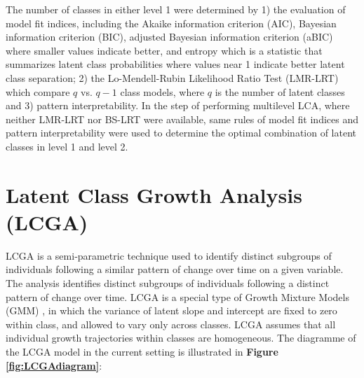 The number of classes in either level 1 were determined by 1) the evaluation of model fit indices, including the Akaike information criterion (AIC), Bayesian information criterion (BIC), adjusted Bayesian information criterion (aBIC) where smaller values indicate better, and entropy which is a statistic that summarizes latent class probabilities where values near 1 indicate better latent class separation; 2) the Lo-Mendell-Rubin Likelihood Ratio Test (LMR-LRT) \parencite{lo2001testing, nylund2007deciding} which compare $q$ vs. $q-1$ class models, where $q$ is the number of latent classes and 3) pattern interpretability. In the step of performing multilevel LCA, where neither LMR-LRT nor BS-LRT were available, same rules of model fit indices and pattern interpretability were used to determine the optimal combination of latent classes in level 1 and level 2. \vspace{-0.3cm}

\section{Latent Class Growth Analysis (LCGA)}\vspace{-0.3cm}



LCGA is a semi‐parametric technique used to identify distinct subgroups of individuals following a similar pattern of change over time on a given variable. The analysis identifies distinct subgroups of individuals following a distinct pattern of change over time.  LCGA is a special type of Growth Mixture Models (GMM) \parencite{jung2008introduction}, in which the variance of latent slope and intercept are fixed to zero within class, and allowed to vary only across classes. LCGA assumes that all individual growth trajectories within classes are homogeneous. The diagramme of the LCGA model in the current setting is illustrated in \textbf{Figure \ref{fig:LCGAdiagram}}:

